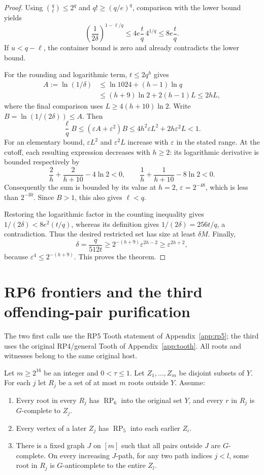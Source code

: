\documentclass[11pt,a4paper]{article}
\theoremstyle{definition}
\theoremstyle{remark}
\numberwithin{equation}{section}
\begin{document}
\begin{proof}
Using \(\binom{q}{\ell}\le2^q\) and \(q!\ge(q/e)^q\), comparison with the lower bound yields
\[
 \left(\frac1{2\delta}\right)^{1-\ell/q}
 \le4e\frac tq\,4^{1/q}\le8e\frac tq.
\]
If \(u<q-\ell\), the container bound is zero and already contradicts the lower bound.

For the rounding and logarithmic term, \(t\le2q^h\) gives
\begin{align*}
 A:=\ln(1/\delta)&\le\ln1024+(h-1)\ln q\\
 &\le(h+9)\ln2+2(h-1)L\le2hL,
\end{align*}
where the final comparison uses \(L\ge4(h+10)\ln2\). Write \(B=\ln(1/(2\delta))\le A\). Then
\[
 \frac\ell q B\le(\varepsilon A+\varepsilon^2)B
 \le4h^2\varepsilon L^2+2h\varepsilon^2L<1.
\]
For an elementary bound, \(\varepsilon L^2\) and \(\varepsilon^2L\) increase with \(\varepsilon\) in the stated range. At the cutoff, each resulting expression decreases with \(h\ge2\): its logarithmic derivative is bounded respectively by
\[
 \frac2h+\frac2{h+10}-4\ln2<0,\qquad
 \frac1h+\frac1{h+10}-8\ln2<0.
\]
Consequently the sum is bounded by its value at \(h=2\), \(\varepsilon=2^{-48}\), which is less than \(2^{-30}\). Since \(B>1\), this also gives \(\ell<q\).

Restoring the logarithmic factor in the counting inequality gives \(1/(2\delta)<8e^2(t/q)\), whereas its definition gives \(1/(2\delta)=256t/q\), a contradiction. Thus the desired restricted set has size at least \(\delta M\). Finally,
\[
 \delta=\frac q{512t}\ge2^{-(h+9)}\varepsilon^{2h-2}
 \ge\varepsilon^{2h+2},
\]
because \(\varepsilon^4\le2^{-(h+9)}\). This proves the theorem.
\end{proof}


\section{RP6 frontiers and the third offending-pair purification}\label{app:rp6front}

The two first calls use the RP5 Tooth statement of Appendix~\ref{app:rp5}; the third uses the original RP4/general Tooth of Appendix~\ref{app:tooth}. All roots and witnesses belong to the same original host.

Let \(m\ge\allowbreak 2^{16}\) be an integer and \(0<\tau\le\allowbreak 1\). Let \(Z_{1},\ldots,Z_{m}\) be disjoint subsets of \(Y\). For each \(j\) let \(R_{j}\) be a set of at most \(m\) roots outside \(Y\). Assume:

\begin{enumerate}[label=(\Roman*)]
\item Every root in every \(R_{j}\) has \(\operatorname{RP}_{6}\) into the original set \(Y\), and every \(r\) in \(R_{j}\) is \(G\)-complete to \(Z_{j}\).
\item Every vertex of a later \(Z_{j}\) has \(\operatorname{RP}_{5}\) into each earlier \(Z_{i}\).
\item There is a fixed graph \(J\) on \([m]\) such that all pairs outside \(J\) are \(G\)-complete. On every increasing \(J\)-path, for any two path indices \(j<l\), some root in \(R_{j}\) is \(G\)-anticomplete to the entire \(Z_{l}\).
\end{enumerate}
\end{document}

